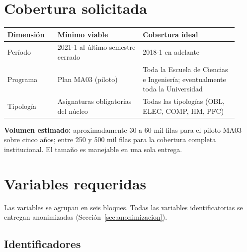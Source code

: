 \documentclass[11pt,a4paper]{article}
\begin{document}
\section{Cobertura solicitada}

\begin{center}
\begin{tabular}{@{}p{0.20\linewidth}p{0.34\linewidth}p{0.38\linewidth}@{}}
\toprule
\textbf{Dimensión} & \textbf{Mínimo viable} & \textbf{Cobertura ideal} \\
\midrule
Período & 2021-1 al último semestre cerrado & 2018-1 en adelante \\
Programa & Plan MA03 (piloto) & Toda la Escuela de Ciencias e Ingeniería; eventualmente toda la Universidad \\
Tipología & Asignaturas obligatorias del núcleo & Todas las tipologías (OBL, ELEC, COMP, HM, PFC) \\
\bottomrule
\end{tabular}
\end{center}

\textbf{Volumen estimado:} aproximadamente 30 a 60 mil filas para el piloto MA03 sobre cinco años; entre 250 y 500 mil filas para la cobertura completa institucional. El tamaño es manejable en una sola entrega.

\section{Variables requeridas}

Las variables se agrupan en seis bloques. Todas las variables identificatorias se entregan anonimizadas (Sección~\ref{sec:anonimizacion}).

\subsection{Identificadores}
\label{sec:vars-id}
\end{document}
